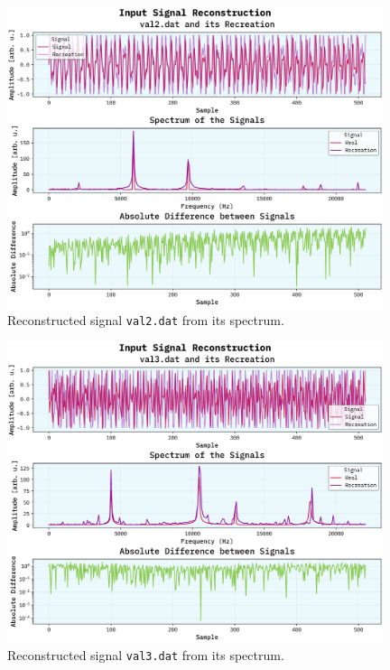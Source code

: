 \documentclass[10pt, titlepage, a4paper]{article}
\begin{document}
\begin{figure}[h]
    \centering
    \includegraphics[width=0.98\textwidth]{../SpectralAnalysis/Images/reconstruction-val2.dat.png}
    \caption{Reconstructed signal \texttt{val2.dat} from its spectrum.}
    \label{fig:reconstructed-signals-2} 
\end{figure}

\begin{figure}[h]
    \centering
    \includegraphics[width=0.98\textwidth]{../SpectralAnalysis/Images/reconstruction-val3.dat.png}
    \caption{Reconstructed signal \texttt{val3.dat} from its spectrum.}
    \label{fig:reconstructed-signals-3}
\end{figure}
\end{document}

